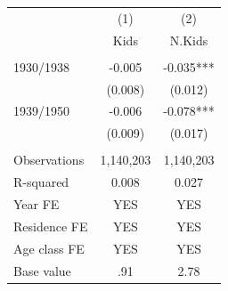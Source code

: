 \begin{tabular}{lcc} \hline
 & (1) & (2) \\
 & Kids & N.Kids \\ \hline
 &  &  \\
1930/1938 & -0.005 & -0.035*** \\
 & (0.008) & (0.012) \\
1939/1950 & -0.006 & -0.078*** \\
 & (0.009) & (0.017) \\
 &  &  \\
Observations & 1,140,203 & 1,140,203 \\
R-squared & 0.008 & 0.027 \\
Year FE & YES & YES \\
Residence FE & YES & YES \\
Age class FE & YES & YES \\
 Base value & .91 & 2.78 \\ \hline
\end{tabular}
